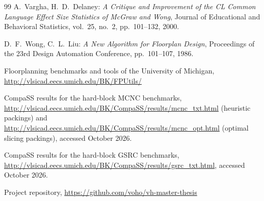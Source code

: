\begin{thebibliography}{99}
A.~Vargha, H.~D.~Delaney:
{\em A Critique and Improvement of the CL Common Language Effect Size Statistics of McGraw and Wong},
Journal of Educational and Behavioral Statistics, vol.~25, no.~2, pp.~101--132,
2000.

D.~F.~Wong, C.~L.~Liu:
{\em A New Algorithm for Floorplan Design},
Proceedings of the 23rd Design Automation Conference, pp.~101--107,
1986.

Floorplanning benchmarks and tools of the University of Michigan,
\url{http://vlsicad.eecs.umich.edu/BK/FPUtils/}

CompaSS results for the hard-block MCNC benchmarks,
\url{http://vlsicad.eecs.umich.edu/BK/CompaSS/results/mcnc_txt.html} (heuristic packings) and
\url{http://vlsicad.eecs.umich.edu/BK/CompaSS/results/mcnc_opt.html} (optimal slicing packings), accessed October 2026.

CompaSS results for the hard-block GSRC benchmarks,
\url{http://vlsicad.eecs.umich.edu/BK/CompaSS/results/gsrc_txt.html}, accessed October 2026.

Project repository,
\url{https://github.com/voho/vh-master-thesis}

\end{thebibliography}
